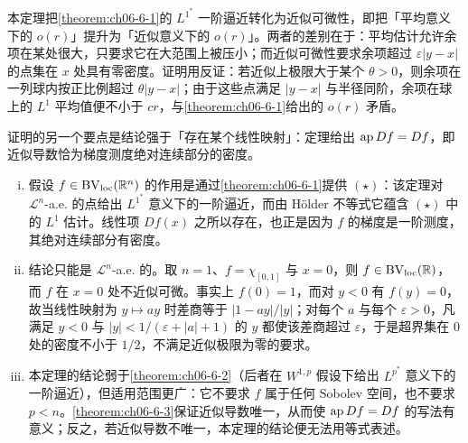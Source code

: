 \documentclass[../../main.tex]{subfiles}%
\begin{document}
\begin{remark}\label{remark:ch06-thm-6-4-动机}
本定理把\cref{theorem:ch06-6-1}的 $L^{1^{*}}$ 一阶逼近转化为近似可微性，即把「平均意义下的 $o(r)$」提升为「近似意义下的 $o(r)$」。两者的差别在于：平均估计允许余项在某处很大，只要求它在大范围上被压小；而近似可微性要求余项超过 $\varepsilon\lvert y-x\rvert$ 的点集在 $x$ 处具有零密度。证明用反证：若近似上极限大于某个 $\theta>0$，则余项在一列球内按正比例超过 $\theta\lvert y-x\rvert$；由于这些点满足 $\lvert y-x\rvert$ 与半径同阶，余项在球上的 $L^1$ 平均值便不小于 $cr$，与\cref{theorem:ch06-6-1}给出的 $o(r)$ 矛盾。%

证明的另一个要点是结论强于「存在某个线性映射」：定理给出 $\operatorname{ap} Df=Df$，即近似导数恰为梯度测度绝对连续部分的密度。
\end{remark}

\begin{remark}\label{remark:ch06-thm-6-4-条件}
\begin{enumerate}[(i)]
\item 假设 $f\in\mathrm{BV}_{\mathrm{loc}}(\mathbb{R}^n)$ 的作用是通过\cref{theorem:ch06-6-1}提供 $(\star)$：该定理对 $\mathcal{L}^n$-a.e. 的点给出 $L^{1^{*}}$ 意义下的一阶逼近，而由 Hölder 不等式它蕴含 $(\star)$ 中的 $L^1$ 估计。线性项 $Df(x)$ 之所以存在，也正是因为 $f$ 的梯度是一阶测度，其绝对连续部分有密度。%
\item 结论只能是 $\mathcal{L}^n$-a.e. 的。取 $n=1$、$f=\chi_{[0,1]}$ 与 $x=0$，则 $f\in\mathrm{BV}_{\mathrm{loc}}(\mathbb{R})$，而 $f$ 在 $x=0$ 处不近似可微。事实上 $f(0)=1$，而对 $y<0$ 有 $f(y)=0$，故当线性映射为 $y\mapsto ay$ 时差商等于 $\lvert1-ay\rvert/\lvert y\rvert$；对每个 $a$ 与每个 $\varepsilon>0$，凡满足 $y<0$ 与 $\lvert y\rvert<1/(\varepsilon+\lvert a\rvert+1)$ 的 $y$ 都使该差商超过 $\varepsilon$，于是超界集在 $0$ 处的密度不小于 $1/2$，不满足近似极限为零的要求。
\item 本定理的结论弱于\cref{theorem:ch06-6-2}（后者在 $W^{1,p}$ 假设下给出 $L^{p^{*}}$ 意义下的一阶逼近），但适用范围更广：它不要求 $f$ 属于任何 Sobolev 空间，也不要求 $p<n$。\cref{theorem:ch06-6-3}保证近似导数唯一，从而使 $\operatorname{ap} Df=Df$ 的写法有意义；反之，若近似导数不唯一，本定理的结论便无法用等式表述。%
\end{enumerate}
\end{remark}
\end{document}
